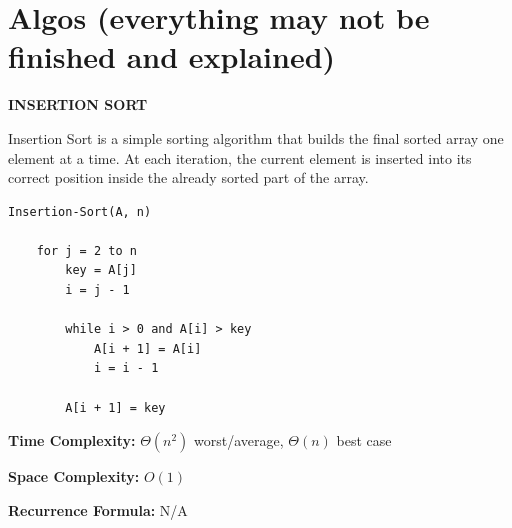 \documentclass[a4paper,12pt]{article}
\begin{document}
\section{Algos (everything may not be finished and explained)}


\begin{tcolorbox}[
    colback=gray!30,
    colframe=black,
    boxrule=1pt,
    arc=0mm
]

\begin{tcolorbox}[
    colback=gray!10,
    colframe=black,
    arc=0mm
]
\centering
{\Huge\bfseries INSERTION SORT}
\end{tcolorbox}

\begin{tcolorbox}[
    colback=gray!10,
    colframe=black,
    arc=0mm
]
\small
Insertion Sort is a simple sorting algorithm that builds the final sorted array one element at a time. 
At each iteration, the current element is inserted into its correct position inside the already sorted part of the array.
\end{tcolorbox}

\begin{tcolorbox}[
    colback=black!5,
    colframe=black,
    arc=0mm,
    title=Pseudo-code
]
\small
\begin{lstlisting}
Insertion-Sort(A, n)

    for j = 2 to n
        key = A[j]
        i = j - 1

        while i > 0 and A[i] > key
            A[i + 1] = A[i]
            i = i - 1

        A[i + 1] = key
\end{lstlisting}
\end{tcolorbox}

\begin{tcolorbox}[
    colback=cyan!20,
    colframe=black,
    arc=0mm
]
\small
\textbf{Time Complexity:} $\Theta(n^2)$ worst/average, $\Theta(n)$ best case
\end{tcolorbox}

\begin{tcolorbox}[
    colback=violet!20,
    colframe=black,
    arc=0mm
]
\small
\textbf{Space Complexity:} $O(1)$
\end{tcolorbox}

\begin{tcolorbox}[
    colback=pink!20,
    colframe=black,
    arc=0mm
]
\small
\textbf{Recurrence Formula:} N/A
\end{tcolorbox}

\end{tcolorbox}
\end{document}
